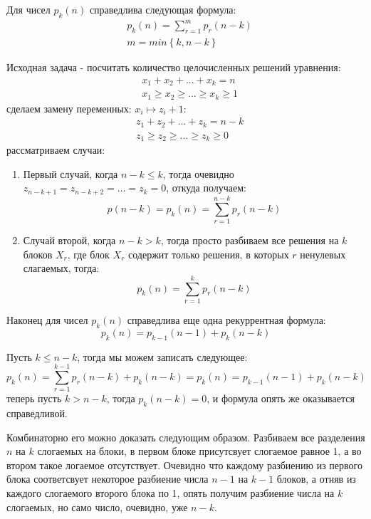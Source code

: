 Для чисел $p_k\left(n\right)$ справедлива следующая формула:
\begin{equation}
	\begin{split}
		& p_k\left(n\right) = \sum_{r=1}^m p_r\left(n-k\right)\\
		& m = min\left\{k, n-k\right\}
	\end{split}
\end{equation}
\begin{Proof}
Исходная задача - посчитать количество целочисленных решений уравнения:
\[
	\begin{split}
		& x_1 + x_2 + ... + x_k = n \\
		& x_1 \ge x_2 \ge ... \ge x_k \ge 1
	\end{split}
\]
сделаем замену переменных: $x_i \mapsto z_i + 1$:
\[
	\begin{split}
		& z_1 + z_2 + ... + z_k = n-k \\
		& z_1 \ge z_2 \ge ... \ge z_k \ge 0
	\end{split}
\]
рассматриваем случаи:
\begin{enumerate}
\item Первый случай, когда $n-k \le k$, тогда очевидно $z_{n-k+1} = z_{n-k+2} = ... = z_k = 0 $, откуда получаем:
\[
	p\left(n-k\right) = p_k\left(n\right) = \sum_{r=1}^{n-k} p_r\left(n-k\right)
\]

\item Случай второй, когда $n-k > k$, тогда просто разбиваем все решения на $k$ блоков $X_r$, где блок $X_r$ содержит только решения, в которых $r$ ненулевых слагаемых, тогда:
\[
	p_k\left(n\right) = \sum_{r=1}^k p_r\left(n-k\right)
\]
\end{enumerate}
\end{Proof}

Наконец для чисел $p_k\left(n\right)$ справедлива еще одна рекуррентная формула:
\begin{equation}
	p_k\left(n\right) = p_{k-1}\left(n-1\right) + p_k\left(n-k\right)
\end{equation}
\begin{Proof}
Пусть $k \le n - k$, тогда мы можем записать следующее:
\[
	p_k\left(n\right) = \sum_{r=1}^{k-1}p_r\left(n-k\right) + p_k\left(n-k\right) = p_k\left(n\right) = p_{k-1}\left(n-1\right) + p_k\left(n-k\right)
\]
теперь пусть $k > n - k$, тогда $p_k\left(n-k\right) = 0$, и формула опять же оказывается справедливой.

Комбинаторно его можно доказать следующим образом. Разбиваем все разделения $n$ на $k$ слогаемых на блоки, в первом блоке присутсвует слогаемое равное 1, а во втором такое логаемое отсутствует. Очевидно что каждому разбиению из первого блока соответсвует некоторое разбиение числа $n-1$ на $k-1$ блоков, а отняв из каждого слогаемого второго блока по 1, опять получим разбиение числа на $k$ слогаемых, но само число, очевидно, уже $n-k$.
\end{Proof}

